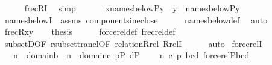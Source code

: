 \begin{isabellebody}
\ \ \ \ \isamarkupfalse%
\ frecRI{}\ \isamarkupfalse%
\ simp\isanewline
\ \ \isamarkupfalse%
\isanewline
\ \ \isamarkupfalse%
\ {\isachardoublequoteopen}{\isacharquery}{\kern0pt}x{\isasymin}names{\isacharunderscore}{\kern0pt}below{\isacharparenleft}{\kern0pt}P{\isacharcomma}{\kern0pt}{\isacharquery}{\kern0pt}y{\isacharparenright}{\kern0pt}{\isachardoublequoteclose}\ \ {\isachardoublequoteopen}{\isacharquery}{\kern0pt}y\ {\isasymin}\ names{\isacharunderscore}{\kern0pt}below{\isacharparenleft}{\kern0pt}P{\isacharcomma}{\kern0pt}{\isacharquery}{\kern0pt}y{\isacharparenright}{\kern0pt}{\isachardoublequoteclose}\isanewline
\ \ \ \ \isamarkupfalse%
\ names{\isacharunderscore}{\kern0pt}belowI\ \ assms\ components{\isacharunderscore}{\kern0pt}in{\isacharunderscore}{\kern0pt}eclose\isanewline
\ \ \ \ \isamarkupfalse%
\ names{\isacharunderscore}{\kern0pt}below{\isacharunderscore}{\kern0pt}def\ \isamarkupfalse%
\ auto\isanewline
\ \ \isamarkupfalse%
\ {\isacartoucheopen}frecR{\isacharparenleft}{\kern0pt}{\isacharquery}{\kern0pt}x{\isacharcomma}{\kern0pt}{\isacharquery}{\kern0pt}y{\isacharparenright}{\kern0pt}{\isacartoucheclose}\isanewline
\ \ \isamarkupfalse%
\ {\isacharquery}{\kern0pt}thesis\isanewline
\ \ \ \ \isamarkupfalse%
\ forcerel{\isacharunderscore}{\kern0pt}def\ frecrel{\isacharunderscore}{\kern0pt}def\isanewline
\ \ \ \ \isamarkupfalse%
\ subsetD{\isacharbrackleft}{\kern0pt}OF\ r{\isacharunderscore}{\kern0pt}subset{\isacharunderscore}{\kern0pt}trancl{\isacharbrackleft}{\kern0pt}OF\ relation{\isacharunderscore}{\kern0pt}Rrel{\isacharbrackright}{\kern0pt}{\isacharbrackright}{\kern0pt}\ RrelI\isanewline
\ \ \ \ \isamarkupfalse%
\ auto\isanewline
{}\isamarkupfalse%
%
\endisatagproof
{\isafoldproof}%
%
\isadelimproof
\isanewline
%
\endisadelimproof
\isanewline
{}\isamarkupfalse%
\ forcerelI{}\ {\isacharcolon}{\kern0pt}\isanewline
\ \ \ {\isachardoublequoteopen}n{}\ {\isasymin}\ domain{\isacharparenleft}{\kern0pt}b{\isacharparenright}{\kern0pt}\ {\isasymor}\ n{}\ {\isasymin}\ domain{\isacharparenleft}{\kern0pt}c{\isacharparenright}{\kern0pt}{\isachardoublequoteclose}\ {\isachardoublequoteopen}p{\isasymin}P{\isachardoublequoteclose}\ {\isachardoublequoteopen}d{\isasymin}P{\isachardoublequoteclose}\isanewline
\ \ \ {\isachardoublequoteopen}{\isasymlangle}{\isasymlangle}{}{\isacharcomma}{\kern0pt}\ n{}{\isacharcomma}{\kern0pt}\ c{\isacharcomma}{\kern0pt}\ p{\isasymrangle}{\isacharcomma}{\kern0pt}\ {\isasymlangle}{}{\isacharcomma}{\kern0pt}b{\isacharcomma}{\kern0pt}c{\isacharcomma}{\kern0pt}d{\isasymrangle}{\isasymrangle}{\isasymin}\ forcerel{\isacharparenleft}{\kern0pt}P{\isacharcomma}{\kern0pt}{\isasymlangle}{}{\isacharcomma}{\kern0pt}b{\isacharcomma}{\kern0pt}c{\isacharcomma}{\kern0pt}d{\isasymrangle}{\isacharparenright}{\kern0pt}{\isachardoublequoteclose}\isanewline

\end{isabellebody}
